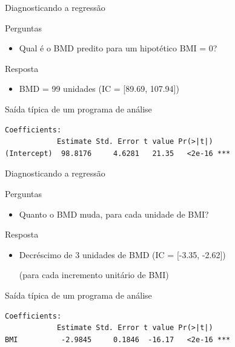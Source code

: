 \documentclass{beamer}
\begin{document}
\begin{frame}[fragile]{Diagnosticando a regressão}
  \begin{block}{Perguntas}
    \begin{itemize}
      \footnotesize
    \item Qual é o BMD predito para um hipotético BMI = 0?
    \end{itemize}
  \end{block}
  \bigskip
  \begin{exampleblock}{Resposta}
    \begin{itemize}
    \item BMD = 99 unidades \footnotesize (IC = [89.69, 107.94])
    \end{itemize}
  \end{exampleblock}
  \vfill
  \begin{exampleblock}{Saída típica de um programa de análise}
    \scriptsize
\begin{verbatim}
Coefficients:
            Estimate Std. Error t value Pr(>|t|)    
(Intercept)  98.8176     4.6281   21.35   <2e-16 ***
\end{verbatim}
\end{exampleblock}
\end{frame}

\begin{frame}[fragile]{Diagnosticando a regressão}
  \begin{block}{Perguntas}
    \begin{itemize}
      \footnotesize
    \item Quanto o BMD muda, para cada unidade de BMI?
    \end{itemize}
  \end{block}
  \bigskip
    \begin{exampleblock}{Resposta}
      \begin{itemize}
      \item Decréscimo de 3 unidades de BMD \footnotesize (IC = [-3.35, -2.62])

        \bigskip
        \scriptsize (para cada incremento unitário de BMI)
    \end{itemize}
  \end{exampleblock}
  \vfill
  \begin{exampleblock}{Saída típica de um programa de análise}
    \scriptsize
\begin{verbatim}
Coefficients:
            Estimate Std. Error t value Pr(>|t|)    
BMI          -2.9845     0.1846  -16.17   <2e-16 ***
\end{verbatim}
\end{exampleblock}
\end{frame}
\end{document}
